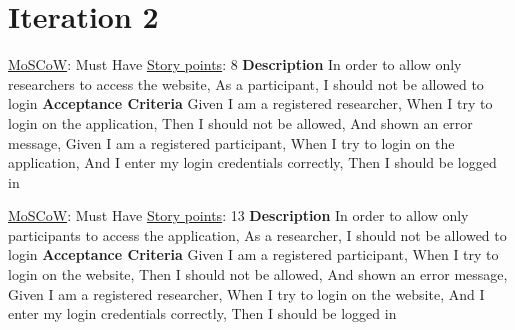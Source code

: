 \documentclass[12pt, a4paper]{report}
\begin{document}
\section{Iteration 2}
\vspace*{5px}
\begin{tcolorbox}[width=\textwidth,colback={White},title={\textbf {Researchers only can login using website}},colbacktitle=grey,coltitle=black]
\underline{MoSCoW}: Must Have 
\hfill
\underline {Story points}: 8
\newline
\newline
\blindtext \textbf{Description}
\newline
In order to allow only researchers to access the website,\newline
As a participant, \newline
I should not be allowed to login \newline
\newline
 \textbf{Acceptance Criteria}
\newline
Given I am a registered researcher,\newline
When I try to login on the application, \newline
Then I should not be allowed, \newline
And shown an error message,\newline
\newline
Given I am a registered participant, \newline
When I try to login on the application, \newline
And I enter my login credentials correctly,\newline
Then I should be logged in 
\end{tcolorbox}  

\begin{tcolorbox}[width=\textwidth,colback={White},title={\textbf {Participants only can login using app}},colbacktitle=grey,coltitle=black]
\underline{MoSCoW}: Must Have 
\hfill
\underline {Story points}: 13
\newline
\newline
\blindtext \textbf{Description} \newline
In order to allow only participants to access the application, \newline
As a researcher, \newline
I should not be allowed to login \newline
\newline
 \textbf{Acceptance Criteria}
\newline
Given I am a registered participant,\newline
When I try to login on the website,\newline
Then I should not be allowed, \newline
And shown an error message, \newline
\newline
Given I am a registered researcher,\newline
When I try to login on the website,\newline
And I enter my login credentials correctly,\newline
Then I should be logged in
\end{tcolorbox}  
\end{document}
